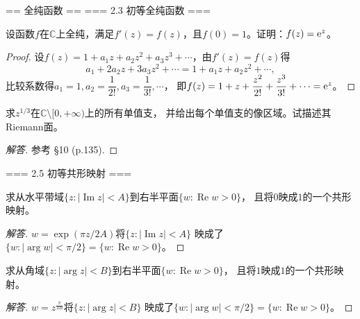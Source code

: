 == 全纯函数 ==
=== 2.3 初等全纯函数 ===
\begin{3}
    设函数$f$在$\mathbb{C}$上全纯，满足$f'(z)=f(z)$，且$f(0)=1$。证明：$f(z)={\rm e}^z$。
\end{3}
\begin{proof}
    设$f(z)=1+a_1z+a_2z^2+a_3z^3+\cdots$，由$f'(z)=f(z)$得
    \[a_1+2a_2z+3a_3z^2+\cdots=1+a_1z+a_2z^2+\cdots,\]
    比较系数得$a_1=1,a_2=\dfrac{1}{2!},a_3=\dfrac{1}{3!},\cdots$，
    即$f(z)=1+z+\dfrac{z^2}{2!}+\dfrac{z^3}{3!}+\cdots={\rm e}^z$。
\end{proof}
\begin{12}
    求$z^{1/3}$在$\mathbb{C}\setminus[0,+\infty)$上的所有单值支，
    并给出每个单值支的像区域。试描述其Riemann面。
\end{12}
\begin{proof}[解答]
    参考\cite{SB} \S10 (p.135).
\end{proof}

=== 2.5 初等共形映射 ===
\begin{1}
    求从水平带域$\{z:|\operatorname{Im}z|<A\}$到右半平面$\{w:\operatorname{Re}w>0\}$，
    且将$0$映成$1$的一个共形映射。
\end{1}
\begin{proof}[解答]
    $w=\exp(\pi z/2A)$将$\{z:|\operatorname{Im}z|<A\}$
    映成了$\{w:|\arg w|<\pi/2\}=\{w:\operatorname{Re}w>0\}$。
\end{proof}
\begin{2}
    求从角域$\{z:|\arg z|<B\}$到右半平面$\{w:\operatorname{Re}w>0\}$，
    且将$1$映成$1$的一个共形映射。
\end{2}
\begin{proof}[解答]
    $w=z^\frac{\pi}{2B}$将$\{z:|\arg z|<B\}$
    映成了$\{w:|\arg w|<\pi/2\}=\{w:\operatorname{Re}w>0\}$。
\end{proof}

